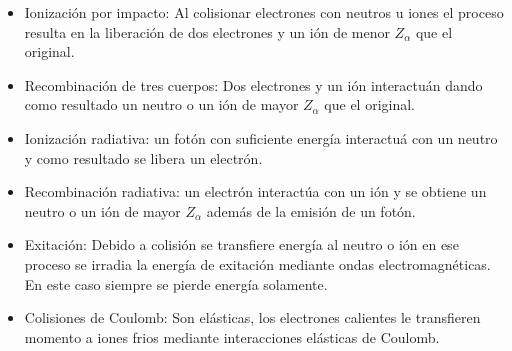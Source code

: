   \begin{itemize}
    \item Ionizaci\'on por impacto: Al colisionar electrones con neutros u iones el proceso resulta en la liberaci\'on de dos electrones y un i\'on de menor $Z_\alpha$ que el original. 
    \item Recombinaci\'on de tres cuerpos: Dos electrones y un i\'on interactu\'an dando como resultado un neutro o un i\'on de mayor $Z_\alpha$ que el original.
    \item Ionizaci\'on radiativa: un fot\'on con suficiente energ\'ia interactu\'a con un neutro y como resultado se libera un electr\'on. 
  \item Recombinaci\'on radiativa: un electr\'on interact\'ua con un i\'on y se obtiene un neutro o un i\'on de mayor $Z_\alpha$ adem\'as de la emisi\'on de un fot\'on.
  \item Exitaci\'on: Debido a colisi\'on se transfiere energ\'ia al neutro o i\'on en ese proceso se irradia la energ\'ia de exitaci\'on mediante ondas electromagn\'eticas. En este caso siempre se pierde energ\'ia solamente.
  \item Colisiones de Coulomb: Son el\'asticas, los electrones calientes le transfieren momento a iones frios mediante interacciones el\'asticas de Coulomb.
  \end{itemize} 

